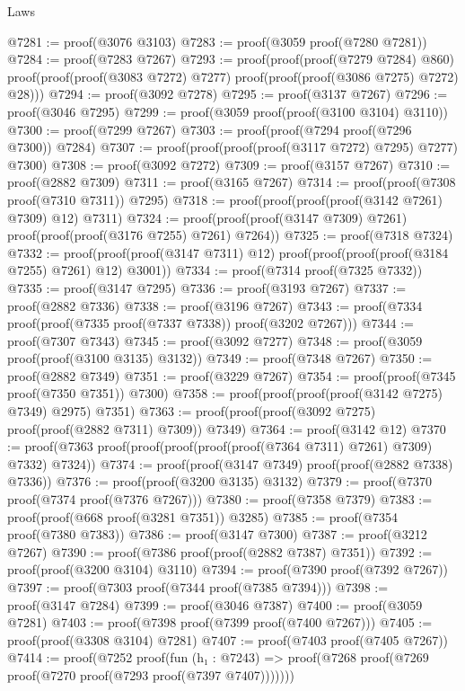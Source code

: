 \begin{lexlean}{Laws}
\begin{coremodule}
@7281 := proof(@3076 @3103)
@7283 := proof(@3059 proof(@7280 @7281))
@7284 := proof(@7283 @7267)
@7293 := proof(proof(proof(@7279 @7284) @860)
      proof(proof(proof(@3083 @7272) @7277) proof(proof(proof(@3086 @7275) @7272) @28)))
@7294 := proof(@3092 @7278)
@7295 := proof(@3137 @7267)
@7296 := proof(@3046 @7295)
@7299 := proof(@3059 proof(proof(@3100 @3104) @3110))
@7300 := proof(@7299 @7267)
@7303 := proof(proof(@7294 proof(@7296 @7300)) @7284)
@7307 := proof(proof(proof(proof(@3117 @7272) @7295) @7277) @7300)
@7308 := proof(@3092 @7272)
@7309 := proof(@3157 @7267)
@7310 := proof(@2882 @7309)
@7311 := proof(@3165 @7267)
@7314 := proof(proof(@7308 proof(@7310 @7311)) @7295)
@7318 := proof(proof(proof(proof(@3142 @7261) @7309) @12) @7311)
@7324 := proof(proof(proof(@3147 @7309) @7261) proof(proof(proof(@3176 @7255) @7261) @7264))
@7325 := proof(@7318 @7324)
@7332 := proof(proof(proof(@3147 @7311) @12)
      proof(proof(proof(proof(@3184 @7255) @7261) @12) @3001))
@7334 := proof(@7314 proof(@7325 @7332))
@7335 := proof(@3147 @7295)
@7336 := proof(@3193 @7267)
@7337 := proof(@2882 @7336)
@7338 := proof(@3196 @7267)
@7343 := proof(@7334 proof(proof(@7335 proof(@7337 @7338)) proof(@3202 @7267)))
@7344 := proof(@7307 @7343)
@7345 := proof(@3092 @7277)
@7348 := proof(@3059 proof(proof(@3100 @3135) @3132))
@7349 := proof(@7348 @7267)
@7350 := proof(@2882 @7349)
@7351 := proof(@3229 @7267)
@7354 := proof(proof(@7345 proof(@7350 @7351)) @7300)
@7358 := proof(proof(proof(proof(@3142 @7275) @7349) @2975) @7351)
@7363 := proof(proof(proof(@3092 @7275) proof(proof(@2882 @7311) @7309)) @7349)
@7364 := proof(@3142 @12)
@7370 := proof(@7363 proof(proof(proof(proof(proof(@7364 @7311) @7261) @7309) @7332) @7324))
@7374 := proof(proof(@3147 @7349) proof(proof(@2882 @7338) @7336))
@7376 := proof(proof(@3200 @3135) @3132)
@7379 := proof(@7370 proof(@7374 proof(@7376 @7267)))
@7380 := proof(@7358 @7379)
@7383 := proof(proof(@668 proof(@3281 @7351)) @3285)
@7385 := proof(@7354 proof(@7380 @7383))
@7386 := proof(@3147 @7300)
@7387 := proof(@3212 @7267)
@7390 := proof(@7386 proof(proof(@2882 @7387) @7351))
@7392 := proof(proof(@3200 @3104) @3110)
@7394 := proof(@7390 proof(@7392 @7267))
@7397 := proof(@7303 proof(@7344 proof(@7385 @7394)))
@7398 := proof(@3147 @7284)
@7399 := proof(@3046 @7387)
@7400 := proof(@3059 @7281)
@7403 := proof(@7398 proof(@7399 proof(@7400 @7267)))
@7405 := proof(proof(@3308 @3104) @7281)
@7407 := proof(@7403 proof(@7405 @7267))
@7414 := proof(@7252
      proof(fun (h₁ : @7243) =>
        proof(@7268 proof(@7269 proof(@7270 proof(@7293 proof(@7397 @7407)))))))

\end{coremodule}
\end{lexlean}
